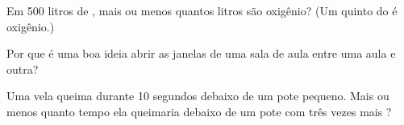\begin{exercise}[$\star$]\label{exo:g4:air-a-mixture-of-gases:9}
Em 500 litros de , mais ou menos quantos litros são oxigênio? (Um
quinto do  é oxigênio.)
\end{exercise}

\begin{exercise}[$\star\star$]\label{exo:g4:air-a-mixture-of-gases:10}
Por que é uma boa ideia abrir as janelas de uma sala de aula entre uma
aula e outra?
\end{exercise}

\begin{exercise}[$\star\star$]\label{exo:g4:air-a-mixture-of-gases:11}
Uma vela queima durante 10 segundos debaixo de um pote pequeno. Mais ou
menos quanto tempo ela queimaria debaixo de um pote com três vezes mais
?
\end{exercise}
